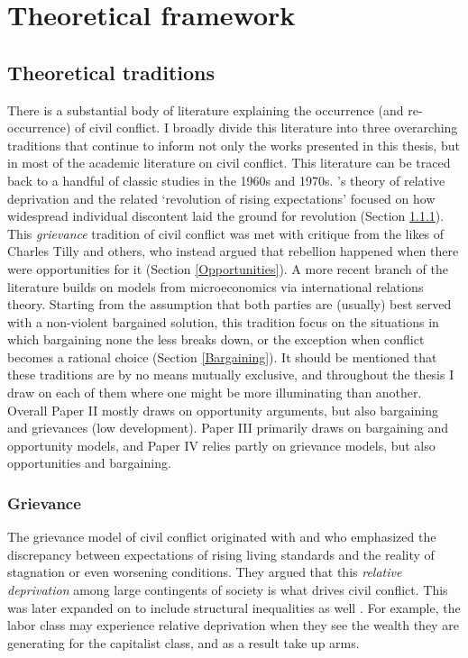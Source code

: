 \section{Theoretical framework}
\label{Theoretical framework}

\subsection{Theoretical traditions} \label{traditions}

There is a substantial body of literature explaining the occurrence (and
re-occurrence) of civil conflict. I broadly divide this literature into three
overarching traditions that continue to inform not only the works presented in
this thesis, but in most of the academic literature on civil conflict. This
literature can be traced back to a handful of classic studies in the 1960s and
1970s. \citet{GurrTedRobert1970Wmr}'s theory of relative deprivation and the
related `revolution of rising expectations' \citep{Davies_1962} focused on how
widespread individual discontent laid the ground for revolution (Section
\ref{Grievance}). This \textit{grievance} tradition of civil conflict was met
with critique from the likes of Charles Tilly and  others, who instead argued
that rebellion happened when there were opportunities for it (Section
\ref{Opportunities}). A more recent branch of the literature builds on models
from microeconomics via international relations theory. Starting from the
assumption that both parties are (usually) best served with a non-violent
bargained solution, this tradition focus on the situations in which bargaining
none the less breaks down, or the exception when conflict becomes a rational
choice (Section \ref{Bargaining}). It should be mentioned that these traditions
are by no means mutually exclusive, and throughout the thesis I draw on each of
them where one might be more illuminating than another. Overall Paper II mostly
draws on opportunity arguments, but also bargaining and grievances (low
development). Paper III  primarily draws on bargaining and opportunity models,
and Paper IV relies partly on grievance models, but also opportunities and
bargaining.

\subsubsection{Grievance} \label{Grievance}

The grievance model of civil conflict originated with
\citet{GurrTedRobert1970Wmr} and \citet{Davies_1962} who emphasized the
discrepancy between expectations of rising living standards and the reality of
stagnation or even worsening conditions. They argued that this \textit{relative
deprivation} among large contingents of society is what drives civil conflict.
This was later expanded on to include structural inequalities as well
\citep{Muller_1985, Muller_1987, ScottJamesC1977TMEo}. For example, the labor
class may experience relative deprivation when they see the wealth they are
generating for the capitalist class, and as a result take up arms.

